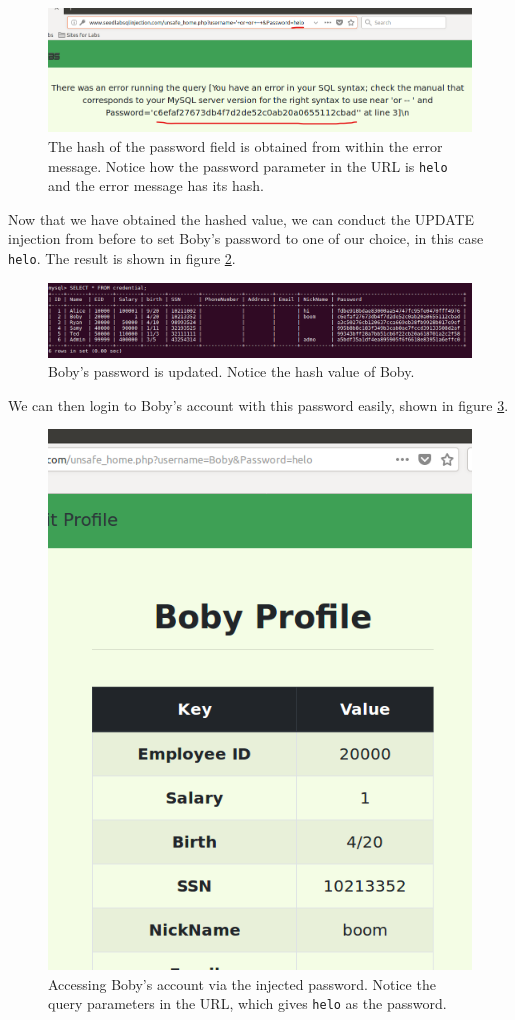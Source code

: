 \documentclass[12pt,reqno]{amsart}
\newcommand{\code}[1]{\texttt{#1}}
\begin{document}
\begin{figure}[h]
\includegraphics[width=\linewidth]{screenshots/SQL_BOBPASS_1.png}
\caption{The hash of the password field is obtained from within the error message. Notice how the password parameter in the URL is \code{helo} and the error message has its hash.}
\label{fig:7}
\end{figure}

Now that we have obtained the hashed value, we can conduct the UPDATE injection from before to set Boby's password to one of our choice, in this case \code{helo}. The result is shown in figure \ref{fig:8}.

\begin{figure}[h]
\includegraphics[width=\linewidth]{screenshots/SQL_BOBPASS_2.png}
\caption{Boby's password is updated. Notice the hash value of Boby.}
\label{fig:8}
\end{figure}

We can then login to Boby's account with this password easily, shown in figure \ref{fig:9}.

\begin{figure}[h]
\includegraphics[width=0.35\linewidth]{screenshots/SQL_BOBPASS_3.png}
\caption{Accessing Boby's account via the injected password. Notice the query parameters in the URL, which gives \code{helo} as the password.}
\label{fig:9}
\end{figure}
\end{document}
